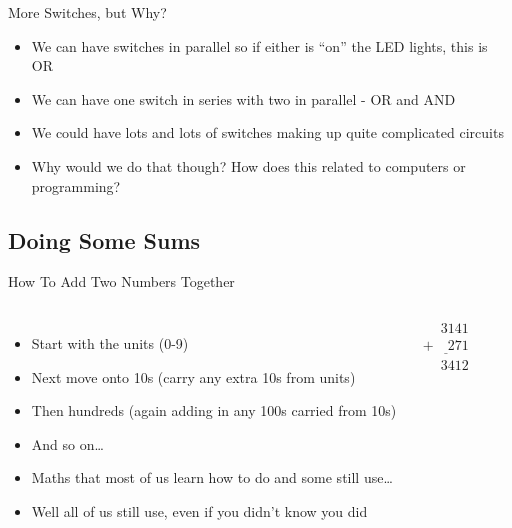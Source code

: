 \documentclass{beamer}
\begin{document}
\begin{frame}{More Switches, but Why?}
  \begin{itemize}
  \item
    We can have switches in parallel so if either is ``on'' the LED lights, this is OR
  \item
    We can have one switch in series with two in parallel - OR and AND
  \item
    We could have lots and lots of switches making up quite complicated circuits
  \item
    Why would we do that though?  How does this related to computers or programming?
  \end{itemize}
\end{frame}

\subsection[Maths]{Doing Some Sums}

\begin{frame}{How To Add Two Numbers Together}
  \begin{columns}
    \begin{itemize}
    \item
      Start with the units (0-9) 
    \item
      Next move onto 10s (carry any extra 10s from units)
    \item
      Then hundreds (again adding in any 100s carried from 10s)
    \item
      And so on\dots
    \item
      Maths that most of us learn how to do and some still use\dots
    \item
      Well all of us still use, even if you didn't know you did
    \end{itemize}

    \begin{equation*}
      \begin{array}{c}
        \phantom{+9}3141\\
        \underline{+\phantom{99}271}\\
        \phantom{+9}3412\\
      \end{array}
    \end{equation*}
  \end{columns}
  
\end{frame}
\end{document}
